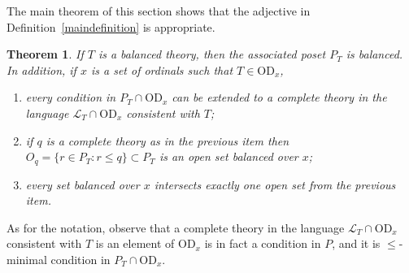 \documentclass{article}
\newcommand{\vd}{\mathrm{OD}}
\newtheorem{theorem}{Theorem}[section]
\theoremstyle{definition}
\begin{document}
\noindent The main theorem of this section shows that the adjective in Definition~\ref{maindefinition} is appropriate.

\begin{theorem}
	\label{balancetheorem}
	If $T$ is a balanced theory, then the associated poset $P_T$ is balanced. In addition, if $x$ is a set of ordinals such that $T\in\vd_x$,
	
	\begin{enumerate} 
		\item every condition in $P_T\cap\vd_x$ can be extended to a complete theory in the language $\mathcal{L}_T\cap\vd_x$ consistent with $T$;
		\item if $q$ is a complete theory as in the previous item then $O_q=\{r\in P_T\colon r\leq q\}\subset P_T$ is an open set balanced over $x$;
		\item every set balanced over $x$ intersects exactly one open set from the previous item.
	\end{enumerate}
\end{theorem}

\noindent As for the notation, observe that a complete theory in the language $\mathcal{L}_T\cap\vd_x$ consistent with $T$ is an element of $\vd_x$ is in fact a condition in $P$, and it is $\leq$-minimal condition in $P_T\cap\vd_x$.
\end{document}

